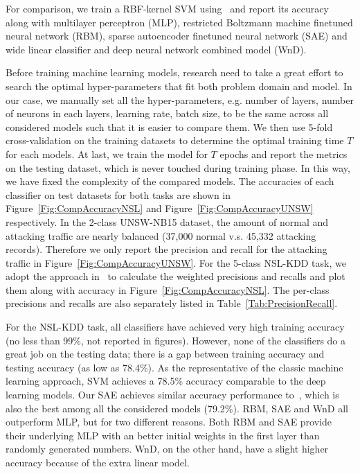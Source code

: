 For comparison, we train a RBF-kernel SVM using~\cite{ScikitLearnSVM} and report its accuracy along
with multilayer perceptron (MLP), restricted Boltzmann machine finetuned neural network (RBM),
sparse autoencoder finetuned neural network (SAE) and wide linear classifier and deep neural network combined model (WnD).

Before training machine learning models, research need to take a great effort to search
the optimal hyper-parameters that fit both problem domain and model.
In our case, we manually set all the hyper-parameters, e.g. number of layers, number of neurons
in each layers, learning rate, batch size, to be the same across all considered models such that
it is easier to compare them.
We then use 5-fold cross-validation on the training datasets to determine the optimal training time $T$
for each models.
At last, we train the model for $T$ epochs and report the metrics on the testing dataset,
which is never touched during training phase.
In this way, we have fixed the complexity of the compared models.
The accuracies of each classifier on test datasets for both tasks are
shown in Figure~\ref{Fig:CompAccuracyNSL} and Figure~\ref{Fig:CompAccuracyUNSW} respectively.
In the 2-class UNSW-NB15 dataset,
the amount of normal and attacking traffic are nearly balanced (37,000 normal v.s. 45,332 attacking records).
Therefore we only report the precision and recall for the attacking traffic in Figure~\ref{Fig:CompAccuracyUNSW}.
For the 5-class NSL-KDD task, we adopt the approach in~\cite{STL-NIDS}
to calculate the weighted precisions and recalls and plot them along with accuracy in Figure~\ref{Fig:CompAccuracyNSL}.
The per-class precisions and recalls are also separately listed in Table~\ref{Tab:PrecisionRecall}.

For the NSL-KDD task, all classifiers have achieved very high training accuracy (no less than 99\%, not reported in figures).
However, none of the classifiers do a great job on the testing data;
there is a gap between training accuracy and testing accuracy (as low as 78.4\%).
As the representative of the classic machine learning approach, SVM achieves a 78.5\% accuracy
comparable to the deep learning models.
Our SAE achieves similar accuracy performance to~\cite{STL-NIDS}, which is
also the best among all the considered models (79.2\%).
RBM, SAE and WnD all outperform MLP, but for two different reasons.
Both RBM and SAE provide their underlying MLP with an better initial weights in the first layer
than randomly generated numbers.
WnD, on the other hand, have a slight higher accuracy because of the extra linear model.

